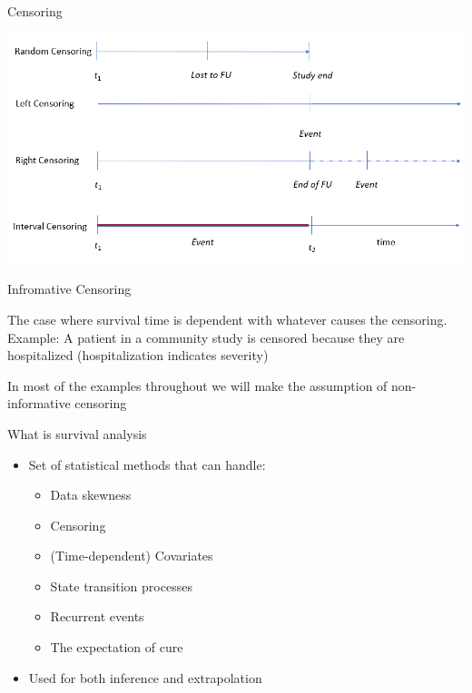 \documentclass[
  ignorenonframetext,
]{beamer}
\providecommand{\tightlist}{%
  \setlength{\itemsep}{0pt}\setlength{\parskip}{0pt}}
\begin{document}
\begin{frame}{Censoring}
\protect\hypertarget{censoring}{}

\includegraphics[width=1\linewidth]{figures/censoring}

\end{frame}

\begin{frame}{Infromative Censoring}
\protect\hypertarget{infromative-censoring}{}

The case where survival time is dependent with whatever causes the
censoring. Example: A patient in a community study is censored because
they are hospitalized (hospitalization indicates severity)

In most of the examples throughout we will make the assumption of
non-informative censoring

\end{frame}

\begin{frame}{What is survival analysis}
\protect\hypertarget{what-is-survival-analysis}{}

\begin{itemize}
\tightlist
\item
  Set of statistical methods that can handle:

  \begin{itemize}
  \tightlist
  \item
    Data skewness
  \item
    Censoring
  \item
    (Time-dependent) Covariates
  \item
    State transition processes
  \item
    Recurrent events
  \item
    The expectation of cure
  \end{itemize}
\item
  Used for both inference and extrapolation
\end{itemize}

\end{frame}
\end{document}
